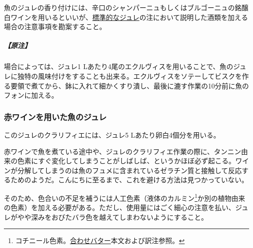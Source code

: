 \begin{recette}
魚のジュレの香り付けには、辛口のシャンパーニュもしくはブルゴーニュの銘醸白ワインを用いるといいが、\protect\hyperlink{gelees-ordinaires}{標準的なジュレ}の注において説明した酒類を加える場合の注意事項を勘案すること。

\hypertarget{nota-gelee-de-poisson-blanche}{%
\subparagraph{【原注】}\label{nota-gelee-de-poisson-blanche}}

場合によっては、ジュレ1
Lあたり4尾のエクルヴィスを用いることで、魚のジュレに独特の風味付けをすることも出来る。エクルヴィスをソテーしてビスクを作る要領で煮てから、鉢に入れて細かくすり潰し、最後に漉す作業の10分前に魚のフォンに加える。

\hypertarget{gelee-de-poisson-au-vin-rouge}{%
\subsubsection{赤ワインを用いた魚のジュレ}\label{gelee-de-poisson-au-vin-rouge}}



このジュレのクラリフィエには、ジュレ5 Lあたり卵白4個分を用いる。

赤ワインで魚を煮ている途中や、ジュレのクラリフィエ作業の際に、タンニン由来の色素にすぐ変化してしまうことがしばしば、というかほぼ必ず起こる。ワインが分解してしまうのは魚のフュメに含まれているゼラチン質と接触して反応するためのようだ。こんにちに至るまで、これを避ける方法は見つかっていない。

そのため、色合いの不足を補うには人工色素（液体のカルミン\footnote{コチニール色素。\protect\hyperlink{beurres-composes}{合わせバター}本文および訳注参照。}か別の植物由来の色素）を加える必要がある。ただし、使用量にはごく細心の注意を払い、ジュレがやや深みをおびたバラ色を越えてしまわないようにすること。
\end{recette}